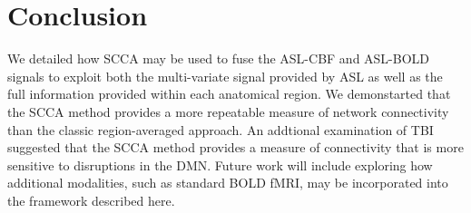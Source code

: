 \documentclass{llncs}
\begin{document}
\section{Conclusion}
We detailed how SCCA may be used to fuse the ASL-CBF and ASL-BOLD signals to exploit both the multi-variate signal provided by ASL as well as the full information provided within each anatomical region. We demonstarted that the SCCA method provides a more repeatable measure of network connectivity than the classic region-averaged approach. An addtional examination of TBI suggested that the SCCA method provides a measure of connectivity that is more sensitive to disruptions in the DMN.  Future work will include exploring how additional modalities, such as standard BOLD fMRI, may be incorporated into the framework described here.



\end{document}
